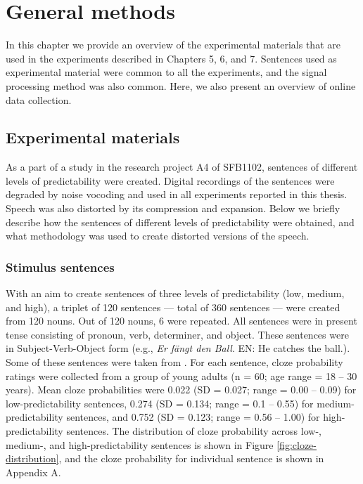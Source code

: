 \documentclass[a4paper, nobind]{templates/ociamthesis}
\renewcommand{\chaptermark}[1]{\markboth{\thechapter. #1}{\thechapter. #1}}
\begin{document}
\hypertarget{general-methods}{%
\chapter{General methods}\label{general-methods}}

\chaptermark{Methods}

In this chapter we provide an overview of the experimental materials that are used in the experiments described in Chapters 5, 6, and 7.
Sentences used as experimental material were common to all the experiments,
and the signal processing method was also common.
Here, we also present an overview of online data collection.

\hypertarget{experimental-materials}{%
\section{Experimental materials}\label{experimental-materials}}

As a part of a study in the research project A4 of SFB1102, sentences of different levels of predictability were created.
Digital recordings of the sentences were degraded by noise vocoding and used in all experiments reported in this thesis.
Speech was also distorted by its compression and expansion.
Below we briefly describe how the sentences of different levels of predictability were obtained,
and what methodology was used to create distorted versions of the speech.

\hypertarget{stimulus-sentences}{%
\subsection{Stimulus sentences}\label{stimulus-sentences}}

With an aim to create sentences of three levels of predictability (low, medium, and high), a triplet of 120 sentences --- total of 360 sentences --- were created from 120 nouns.
Out of 120 nouns, 6 were repeated.
All sentences were in present tense consisting of pronoun, verb, determiner, and object.
These sentences were in Subject-Verb-Object form (e.g., \emph{Er fängt den Ball}. EN: He catches the ball.).
Some of these sentences were taken from \textcite{Obleser2010}.
For each sentence, cloze probability ratings were collected from a group of young adults (n = 60; age range = 18 -- 30 years).
Mean cloze probabilities were 0.022 (SD = 0.027; range = 0.00 -- 0.09) for low-predictability sentences,
0.274 (SD = 0.134; range = 0.1 -- 0.55) for medium-predictability sentences,
and 0.752 (SD = 0.123; range = 0.56 -- 1.00) for high-predictability sentences.
The distribution of cloze probability across low-, medium-, and high-predictability sentences is shown in Figure \ref{fig:cloze-distribution},
and the cloze probability for individual sentence is shown in Appendix A.
\end{document}
